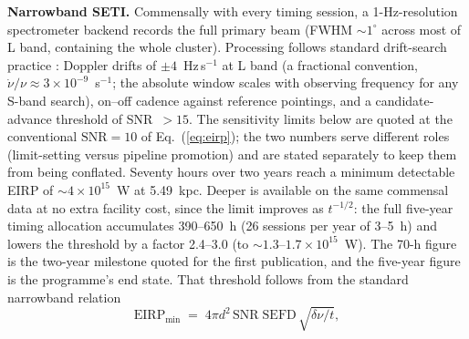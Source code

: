 \documentclass[11pt]{article}
\begin{document}
\textbf{Narrowband SETI.} Commensally with every timing session, a 1-Hz-resolution spectrometer backend records the full primary beam (FWHM $\sim 1^{\circ}$ across most of L band, containing the whole cluster). Processing follows standard drift-search practice \citep{Enriquez2017}: Doppler drifts of $\pm 4$~Hz\,s$^{-1}$ at L band (a fractional convention, $\dot\nu/\nu \approx 3\times10^{-9}$~s$^{-1}$; the absolute window scales with observing frequency for any S-band search), on--off cadence against reference pointings, and a candidate-advance threshold of SNR~$>15$. The sensitivity limits below are quoted at the conventional $\mathrm{SNR}=10$ of Eq.~(\ref{eq:eirp}); the two numbers serve different roles (limit-setting versus pipeline promotion) and are stated separately to keep them from being conflated. Seventy hours over two years reach a minimum detectable EIRP of $\sim 4\times10^{15}$~W at 5.49~kpc. Deeper is available on the same commensal data at no extra facility cost, since the limit improves as $t^{-1/2}$: the full five-year timing allocation accumulates 390--650~h (26 sessions per year of 3--5~h) and lowers the threshold by a factor 2.4--3.0 (to $\sim 1.3$--$1.7\times10^{15}$~W). The 70-h figure is the two-year milestone quoted for the first publication, and the five-year figure is the programme's end state. That threshold follows from the standard narrowband relation
\begin{equation}
\mathrm{EIRP}_{\min} \;=\; 4\pi d^{2}\,\mathrm{SNR}\;\mathrm{SEFD}\,\sqrt{\delta\nu/t},
\label{eq:eirp}
\end{equation}
\end{document}

